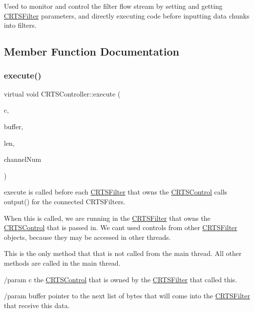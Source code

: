 Used to monitor and control the filter flow stream by setting and getting \hyperlink{classCRTSFilter}{C\+R\+T\+S\+Filter} parameters, and directly executing code before inputting data chunks into filters. 

\subsection{Member Function Documentation}
\mbox{\label{classCRTSController_af9d93f0eee3c2d0969c6aaaaf94eb839}} 
\subsubsection{\texorpdfstring{execute()}{execute()}}
{\footnotesize\ttfamily virtual void C\+R\+T\+S\+Controller\+::execute (\begin{DoxyParamCaption}\item[{\hyperlink{classCRTSControl}{C\+R\+T\+S\+Control} $\ast$}]{c,  }\item[{const void $\ast$}]{buffer,  }\item[{size\+\_\+t}]{len,  }\item[{uint32\+\_\+t}]{channel\+Num }\end{DoxyParamCaption})\hspace{0.3cm}{\ttfamily [pure virtual]}}

execute is called before each \hyperlink{classCRTSFilter}{C\+R\+T\+S\+Filter} that owns the \hyperlink{classCRTSControl}{C\+R\+T\+S\+Control} calls output() for the connected C\+R\+T\+S\+Filters.

When this is called, we are running in the \hyperlink{classCRTSFilter}{C\+R\+T\+S\+Filter} that owns the \hyperlink{classCRTSControl}{C\+R\+T\+S\+Control} that is passed in. We can\textquotesingle{}t used controls from other \hyperlink{classCRTSFilter}{C\+R\+T\+S\+Filter} objects, because they may be accessed in other threads.

This is the only method that that is not called from the main thread. All other methods are called in the main thread.

/param c the \hyperlink{classCRTSControl}{C\+R\+T\+S\+Control} that is owned by the \hyperlink{classCRTSFilter}{C\+R\+T\+S\+Filter} that called this.

/param buffer pointer to the next list of bytes that will come into the \hyperlink{classCRTSFilter}{C\+R\+T\+S\+Filter} that receive this data.

